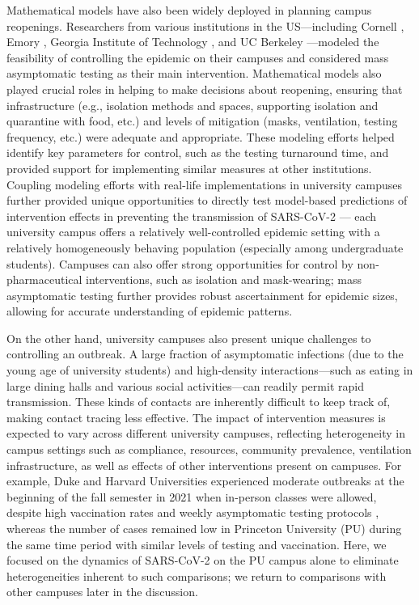 \documentclass[12pt]{article}
\begin{document}
Mathematical models have also been widely deployed in planning campus reopenings.
Researchers from various institutions in the US---including Cornell \citep{frazier2022modeling}, Emory \citep{lopman2020model}, Georgia Institute of Technology \citep{gibson2021surveillance}, and UC Berkeley \citep{brook2021optimizing}---modeled the feasibility of controlling the epidemic on their campuses and considered mass asymptomatic testing as their main intervention.
Mathematical models also played crucial roles in helping to make decisions about reopening, ensuring that infrastructure (e.g., isolation methods and spaces, supporting isolation and quarantine with food, etc.) and levels of mitigation (masks, ventilation, testing frequency, etc.) were adequate and appropriate.
These modeling efforts helped identify key parameters for control, such as the testing turnaround time, and provided support for implementing similar measures at other institutions.
Coupling modeling efforts with real-life implementations in university campuses further provided unique opportunities to directly test model-based predictions of intervention effects in preventing the transmission of SARS-CoV-2 \citep{frazier2022modeling}---
each university campus offers a relatively well-controlled epidemic setting with a relatively homogeneously behaving population (especially among undergraduate students).
Campuses can also offer strong opportunities for control by non-pharmaceutical interventions, such as isolation and mask-wearing;
mass asymptomatic testing further provides robust ascertainment for epidemic sizes, allowing for accurate understanding of epidemic patterns.

On the other hand, university campuses also present unique challenges to controlling an outbreak.
A large fraction of asymptomatic infections (due to the young age of university students) and high-density interactions---such as eating in large dining halls and various social activities---can readily permit rapid transmission.
These kinds of contacts are inherently difficult to keep track of, making contact tracing less effective.
The impact of intervention measures is expected to vary across different university campuses, reflecting heterogeneity in campus settings such as compliance, resources, community prevalence, ventilation infrastructure, as well as effects of other interventions present on campuses.
For example, Duke and Harvard Universities experienced moderate outbreaks at the beginning of the fall semester in 2021 when in-person classes were allowed, despite high vaccination rates and weekly asymptomatic testing protocols \citep{dukeoutbreak,harvardoutbreak}, whereas the number of cases remained low in Princeton University (PU) during the same time period with similar levels of testing and vaccination.
Here, we focused on the dynamics of SARS-CoV-2 on the PU campus alone to eliminate heterogeneities inherent to such comparisons; we return to comparisons with other campuses later in the discussion.
\end{document}
